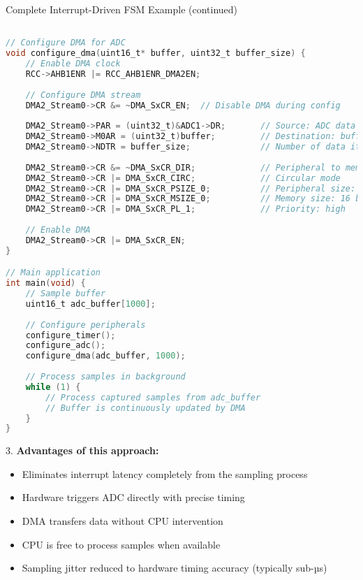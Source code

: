 \begin{example2}{Complete Interrupt-Driven FSM Example (continued)}
\begin{lstlisting}[language=C, style=basesmol]

// Configure DMA for ADC
void configure_dma(uint16_t* buffer, uint32_t buffer_size) {
    // Enable DMA clock
    RCC->AHB1ENR |= RCC_AHB1ENR_DMA2EN;
    
    // Configure DMA stream
    DMA2_Stream0->CR &= ~DMA_SxCR_EN;  // Disable DMA during config
    
    DMA2_Stream0->PAR = (uint32_t)&ADC1->DR;       // Source: ADC data register
    DMA2_Stream0->M0AR = (uint32_t)buffer;         // Destination: buffer
    DMA2_Stream0->NDTR = buffer_size;              // Number of data items
    
    DMA2_Stream0->CR &= ~DMA_SxCR_DIR;             // Peripheral to memory
    DMA2_Stream0->CR |= DMA_SxCR_CIRC;             // Circular mode
    DMA2_Stream0->CR |= DMA_SxCR_PSIZE_0;          // Peripheral size: 16 bits
    DMA2_Stream0->CR |= DMA_SxCR_MSIZE_0;          // Memory size: 16 bits
    DMA2_Stream0->CR |= DMA_SxCR_PL_1;             // Priority: high
    
    // Enable DMA
    DMA2_Stream0->CR |= DMA_SxCR_EN;
}

// Main application
int main(void) {
    // Sample buffer
    uint16_t adc_buffer[1000];
    
    // Configure peripherals
    configure_timer();
    configure_adc();
    configure_dma(adc_buffer, 1000);
    
    // Process samples in background
    while (1) {
        // Process captured samples from adc_buffer
        // Buffer is continuously updated by DMA
    }
}
\end{lstlisting}

3. \textbf{Advantages of this approach:}
   \begin{itemize}
     \item Eliminates interrupt latency completely from the sampling process
     \item Hardware triggers ADC directly with precise timing
     \item DMA transfers data without CPU intervention
     \item CPU is free to process samples when available
     \item Sampling jitter reduced to hardware timing accuracy (typically sub-µs)
   \end{itemize}


\end{example2}

